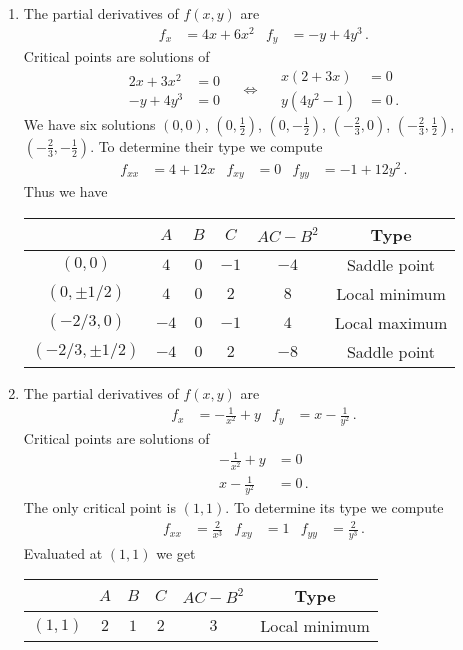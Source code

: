 \begin{solution}
\begin{enumerate}
\item
The partial derivatives of $f(x,y)$ are
\begin{align*}
f_x &= 4x + 6x^2 &
f_y &= -y + 4y^3\,.
\end{align*}
Critical points are solutions of
\[
\begin{aligned}
2x + 3x^2 &= 0 \\
-y + 4y^3 &=0
\end{aligned}
\quad\Leftrightarrow\quad
\begin{aligned}
x(2+3x) &= 0 \\
y(4y^2-1) &= 0\,.
\end{aligned}
\]
We have six solutions $(0,0)$, $\left(0,\frac 12\right)$, $\left(0,-\frac 12\right)$, $\left(-\frac 23,0\right)$, $\left(-\frac 23,\frac 12\right)$, $\left(-\frac 23,-\frac 12\right)$.
To determine their type we compute
\begin{align*}
f_{xx} &= 4 + 12x &
f_{xy} &= 0 &
f_{yy} &= -1 + 12y^2\,.
\end{align*}
Thus we have
\begin{center}
\begin{tabular}{c|ccc|cc}
 & $A$ & $B$ & $C$ & $AC-B^2$ & Type \\ \hline
$\left(0, 0\right)$ & $4$ & $0$ & $-1$ & $-4$ &  Saddle point \\
$\left(0, \pm 1/2 \right)$ & $4$ & $0$ & $2$ & $8$ & Local minimum \\
$\left(-2/3, 0 \right)$ & $-4$ & $0$ & $-1$ & $4$ & Local maximum\\
$\left(-2/3, \pm 1/2 \right)$ & $-4$ & $0$ & $2$ & $-8$ & Saddle point
\end{tabular}
\end{center}

\item
The partial derivatives of $f(x,y)$ are
\begin{align*}
f_x &= -\frac 1{x^2} + y & 
f_y &= x - \frac{1}{y^2}\,.
\end{align*}
Critical points are solutions of
\begin{align*}
-\frac 1{x^2} + y &= 0 \\
x - \frac{1}{y^2} &=0\,.
\end{align*}
The only critical point is $(1,1)$. To determine its type we compute
\begin{align*}
f_{xx} &= \frac{2}{x^3} &
f_{xy} &= 1 &
f_{yy} &= \frac{2}{y^3}\,.
\end{align*}
Evaluated at $(1,1)$ we get
\begin{center}
\begin{tabular}{c|ccc|cc}
 & $A$ & $B$ & $C$ & $AC-B^2$ & Type \\ \hline
$\left(1, 1 \right)$ & $2$ & $1$ & $2$ & $3$ & Local minimum
\end{tabular}
\end{center}
\end{enumerate}
\end{solution}

